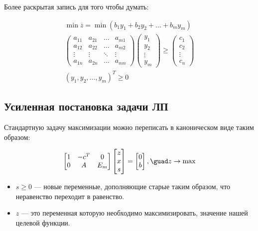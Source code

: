 \documentclass[a4paper,article,14pt]{extarticle}
\begin{document}
Более раскрытая запись для того чтобы думать:

\begin{gather}
    \min \overline z = \min (b_1y_1 + b_2y_2 + \ldots + b_my_m) \\
    \begin{pmatrix}
        a_{11} & a_{21} & \ldots & a_{m1} \\
        a_{12} & a_{22} & \ldots & a_{m2} \\
        \vdots & \vdots & \ddots & \vdots \\
        a_{1n} & a_{2n} & \ldots & a_{mn}
    \end{pmatrix}
    \begin{pmatrix}
        y_1 \\ y_2 \\ \vdots \\ y_m
    \end{pmatrix}
    \ge
    \begin{pmatrix}
        c_1 \\ c_2 \\ \vdots \\ c_n
    \end{pmatrix}
    \\
    (y_1, y_2, \ldots, y_m)^T \ge 0
\end{gather}


\subsection{Усиленная постановка задачи ЛП}

Стандартную задачу максимизации можно переписать в каноническом виде таким образом:

\begin{equation}
    \begin{bmatrix}
        1 & -c^T & 0 \\
        0 & A & E_m
    \end{bmatrix}
    \begin{bmatrix}
        z \\ x \\ s
    \end{bmatrix}
    =
    \begin{bmatrix}
        0 \\ b
    \end{bmatrix}
    , \guad
    z \rightarrow \max
\end{equation}

\begin{itemize}
    \item \(s \ge 0\) --- новые переменные, дополняющие старые таким образом, что неравенство переходит в равенство.
    \item \(z\) --- это переменная которую необходимо максимизировать, значение нашей целевой функции.
\end{itemize}
\end{document}
